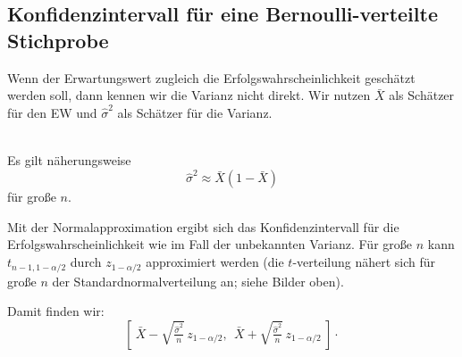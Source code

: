 \subsection*{Konfidenzintervall für eine Bernoulli-verteilte Stichprobe}

Wenn der Erwartungswert zugleich die Erfolgswahrscheinlichkeit geschätzt werden soll, dann kennen wir die Varianz
nicht direkt.
Wir nutzen $\bar X$ als Schätzer für den EW und $\widehat\sigma^2$ als Schätzer für die Varianz.

\begin{er}
     \\
    Es gilt näherungsweise
    \[
        \widehat\sigma^2 \approx \bar X (1-\bar X)
    \]
    für große $n$.
\end{er}

Mit der Normalapproximation ergibt sich das Konfidenzintervall für die Erfolgswahrscheinlichkeit wie im Fall der
unbekannten Varianz.
Für große $n$ kann $t_{n-1,1-\alpha/2}$ durch $z_{1-\alpha/2}$ approximiert werden (die
$t$-\gls{verteilung} nähert sich für große $n$ der Standardnormalverteilung an; siehe Bilder oben).

Damit finden wir:
\begin{equation}
    \label{eq:ki-bernoulli}
    \left[\ \bar X - \sqrt{\tfrac{\widehat\sigma^2}{n}}\, z_{1-\alpha/2},\ \ \bar X + \sqrt{\tfrac{\widehat\sigma^2}
    {n}}\, z_{1-\alpha/2}\ \right] \cdot
\end{equation}





